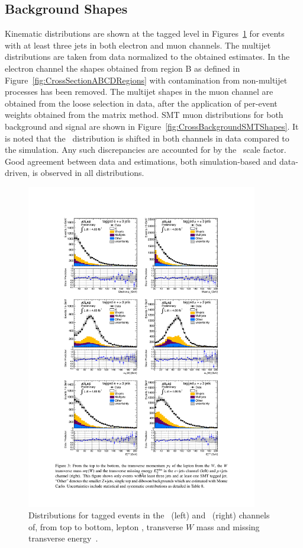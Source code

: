 \subsection{Background Shapes}

Kinematic distributions are shown at the tagged level in Figures~\ref{fig:CrossBackgroundShapes} for events with at least three jets in both electron and muon channels. The multijet distributions are taken from data normalized to the obtained estimates. In the electron channel the shapes obtained from region B as defined in Figure~\ref{fig:CrossSectionABCDRegions} with contamination from non-multijet processes has been removed. The multijet shapes in the muon channel are obtained from the loose selection in data, after the application of per-event weights obtained from the matrix method.
SMT muon distributions for both background and signal are shown in Figure~\ref{fig:CrossBackgroundSMTShapes}. It is noted that the \xsd\ distribution is shifted in both channels in data compared to the simulation. Any such discrepancies are accounted for by the \xsd\ scale factor. Good agreement between data and estimations, both simulation-based and data-driven, is observed in all distributions.

\begin{figure}[htbp]
  \centering
    \includegraphics[width=0.90\textwidth]{PartCrossSection/Plots/h_stacks_elmu_evt_pars.pdf}
    \caption{Distributions for tagged events in the \ejets\ (left) and \mujets\ (right) channels of, from top to bottom, lepton \pt, transverse $W$ mass and missing transverse energy~\cite{Cross:SMTCrossSectionPaper}.}
  \label{fig:CrossBackgroundShapes}
\end{figure}

